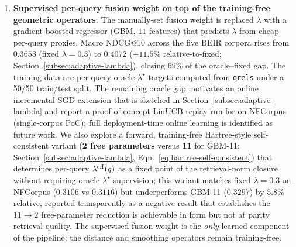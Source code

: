 \documentclass[review,1p]{elsarticle}
\begin{document}
\begin{enumerate}[leftmargin=*]
\item \textbf{Supervised per-query fusion weight on top of the training-free geometric operators.} The manually-set fusion weight is replaced $\lambda$ with a gradient-boosted regressor (GBM, $11$ features) that predicts $\lambda$ from cheap per-query proxies. Macro NDCG@10 across the five BEIR corpora rises from $0.3653$ (fixed $\lambda=0.3$) to $0.4072$ ($+11.5\%$ relative-to-fixed; Section~\ref{subsec:adaptive-lambda}), closing $69\%$ of the oracle--fixed gap. The training data are per-query oracle $\lambda^\star$ targets computed from \texttt{qrels} under a 50/50 train/test split. The remaining oracle gap motivates an online incremental-SGD extension that is sketched in Section~\ref{subsec:adaptive-lambda} and report a proof-of-concept LinUCB replay run for on NFCorpus (single-corpus PoC); full deployment-time online learning is identified as future work. We also explore a forward, training-free Hartree-style self-consistent variant (\textbf{2 free parameters} versus \textbf{11} for GBM-11; Section~\ref{subsec:adaptive-lambda}, Eqn.~\eqref{eq:hartree-self-consistent}) that determines per-query $\lambda^{\rm eff}(q)$ as a fixed point of the retrieval-norm closure without requiring oracle $\lambda^\star$ supervision; this variant matches fixed $\lambda=0.3$ on NFCorpus ($0.3106$ vs $0.3116$) but underperforms GBM-11 ($0.3297$) by $5.8\%$ relative, reported transparently as a negative result that establishes the $11\to 2$ free-parameter reduction is achievable in form but not at parity retrieval quality. The supervised fusion weight is the \emph{only} learned component of the pipeline; the distance and smoothing operators remain training-free.


\end{enumerate}
\end{document}
